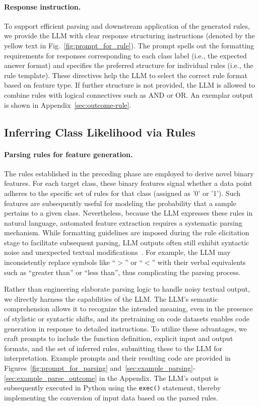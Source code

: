 \vspace*{-0.12in}
\paragraph{Response instruction.} To support efficient parsing and downstream application of the generated rules, we provide the LLM with clear response structuring instructions (denoted by the yellow text in Fig.~\ref{fig:prompt_for_rule}). The prompt spells out the formatting requirements for responses corresponding to each class label (i.e., the expected answer format) and specifies the preferred structure for individual rules (i.e., the rule template). These directives help the LLM to select the correct rule format based on feature type. If further structure is not provided, the LLM is allowed to combine rules with logical connectives such as AND or OR. An exemplar output is shown in Appendix~\ref{sec:outcome-rule}.

\subsection{Inferring Class Likelihood via Rules}
\label{Sec:training}

\paragraph{Parsing rules for feature generation.} The rules established in the preceding phase are employed to derive novel binary features. For each target class, these binary features signal whether a data point adheres to the specific set of rules for that class (assigned as '0' or '1'). Such features are subsequently useful for modeling the probability that a sample pertains to a given class. Nevertheless, because the LLM expresses these rules in natural language, automated feature extraction requires a systematic parsing mechanism. While formatting guidelines are imposed during the rule elicitation stage to facilitate subsequent parsing, LLM outputs often still exhibit syntactic noise and unexpected textual modifications~\cite{kovavc2023large}. For example, the LLM may inconsistently replace symbols like ``$>$” or ``$<$” with their verbal equivalents such as ``greater than'' or ``less than'', thus complicating the parsing process.

Rather than engineering elaborate parsing logic to handle noisy textual output, we directly harness the capabilities of the LLM. The LLM’s semantic comprehension allows it to recognize the intended meaning, even in the presence of stylistic or syntactic shifts, and its pretraining on code datasets enables code generation in response to detailed instructions. To utilize these advantages, we craft prompts to include the function definition, explicit input and output formats, and the set of inferred rules, submitting these to the LLM for interpretation. Example prompts and their resulting code are provided in Figures~\ref{fig:prompt_for_parsing} and~\ref{sec:example_parsing}-\ref{sec:example_parse_outcome} in the Appendix. The LLM’s output is subsequently executed in Python using the \texttt{exec()} statement, thereby implementing the conversion of input data based on the parsed rules.

